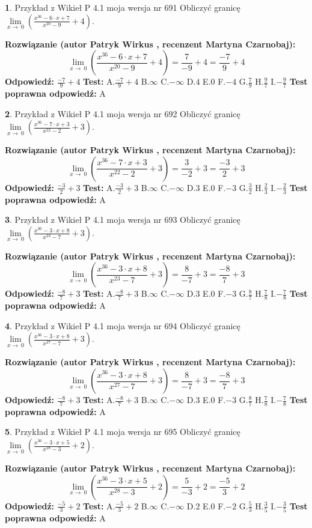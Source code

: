 \documentclass[12pt, a4paper]{article}
\theoremstyle{definition} %
\newtheorem{zad}{}
\newcommand{\zadStart}[1]{\begin{zad}#1\newline}
\newcommand{\zadStop}{\end{zad}}
\newcommand{\rozwStart}[2]{\noindent \textbf{Rozwiązanie (autor #1 , recenzent #2): }\newline}
\newcommand{\rozwStop}{\newline}
\newcommand{\odpStart}{\noindent \textbf{Odpowiedź:}\newline}
\newcommand{\odpStop}{\newline}
\newcommand{\testStart}{\noindent \textbf{Test:}\newline}
\newcommand{\testStop}{\newline}
\newcommand{\kluczStart}{\noindent \textbf{Test poprawna odpowiedź:}\newline}
\newcommand{\kluczStop}{\newline}
\begin{document}
\zadStart{Przykład z Wikieł P 4.1 moja wersja nr 691}
Obliczyć granicę $\lim\limits_{x\to\ 0}(\frac{x^{36}-6 \cdot x +7}{x^{20}-9}+4)$.
\zadStop
\rozwStart{Patryk Wirkus}{Martyna Czarnobaj}
$$\lim\limits_{x\to\ 0}(\frac{x^{36}-6 \cdot x +7}{x^{20}-9}+4)=\frac{7}{-9}+4=\frac{-7}{9}+4$$
\rozwStop
\odpStart
$\frac{-7}{9}+4$
\odpStop
\testStart
A.$\frac{-7}{9}+4$
B.$\infty$
C.$-\infty$
D.$4$
E.$0$
F.$-4$
G.$\frac{7}{9}$
H.$\frac{9}{7}$
I.$-\frac{9}{7}$
\testStop
\kluczStart
A
\kluczStop



\zadStart{Przykład z Wikieł P 4.1 moja wersja nr 692}
Obliczyć granicę $\lim\limits_{x\to\ 0}(\frac{x^{36}-7 \cdot x +3}{x^{22}-2}+3)$.
\zadStop
\rozwStart{Patryk Wirkus}{Martyna Czarnobaj}
$$\lim\limits_{x\to\ 0}(\frac{x^{36}-7 \cdot x +3}{x^{22}-2}+3)=\frac{3}{-2}+3=\frac{-3}{2}+3$$
\rozwStop
\odpStart
$\frac{-3}{2}+3$
\odpStop
\testStart
A.$\frac{-3}{2}+3$
B.$\infty$
C.$-\infty$
D.$3$
E.$0$
F.$-3$
G.$\frac{3}{2}$
H.$\frac{2}{3}$
I.$-\frac{2}{3}$
\testStop
\kluczStart
A
\kluczStop



\zadStart{Przykład z Wikieł P 4.1 moja wersja nr 693}
Obliczyć granicę $\lim\limits_{x\to\ 0}(\frac{x^{36}-3 \cdot x +8}{x^{23}-7}+3)$.
\zadStop
\rozwStart{Patryk Wirkus}{Martyna Czarnobaj}
$$\lim\limits_{x\to\ 0}(\frac{x^{36}-3 \cdot x +8}{x^{23}-7}+3)=\frac{8}{-7}+3=\frac{-8}{7}+3$$
\rozwStop
\odpStart
$\frac{-8}{7}+3$
\odpStop
\testStart
A.$\frac{-8}{7}+3$
B.$\infty$
C.$-\infty$
D.$3$
E.$0$
F.$-3$
G.$\frac{8}{7}$
H.$\frac{7}{8}$
I.$-\frac{7}{8}$
\testStop
\kluczStart
A
\kluczStop



\zadStart{Przykład z Wikieł P 4.1 moja wersja nr 694}
Obliczyć granicę $\lim\limits_{x\to\ 0}(\frac{x^{36}-3 \cdot x +8}{x^{27}-7}+3)$.
\zadStop
\rozwStart{Patryk Wirkus}{Martyna Czarnobaj}
$$\lim\limits_{x\to\ 0}(\frac{x^{36}-3 \cdot x +8}{x^{27}-7}+3)=\frac{8}{-7}+3=\frac{-8}{7}+3$$
\rozwStop
\odpStart
$\frac{-8}{7}+3$
\odpStop
\testStart
A.$\frac{-8}{7}+3$
B.$\infty$
C.$-\infty$
D.$3$
E.$0$
F.$-3$
G.$\frac{8}{7}$
H.$\frac{7}{8}$
I.$-\frac{7}{8}$
\testStop
\kluczStart
A
\kluczStop



\zadStart{Przykład z Wikieł P 4.1 moja wersja nr 695}
Obliczyć granicę $\lim\limits_{x\to\ 0}(\frac{x^{36}-3 \cdot x +5}{x^{28}-3}+2)$.
\zadStop
\rozwStart{Patryk Wirkus}{Martyna Czarnobaj}
$$\lim\limits_{x\to\ 0}(\frac{x^{36}-3 \cdot x +5}{x^{28}-3}+2)=\frac{5}{-3}+2=\frac{-5}{3}+2$$
\rozwStop
\odpStart
$\frac{-5}{3}+2$
\odpStop
\testStart
A.$\frac{-5}{3}+2$
B.$\infty$
C.$-\infty$
D.$2$
E.$0$
F.$-2$
G.$\frac{5}{3}$
H.$\frac{3}{5}$
I.$-\frac{3}{5}$
\testStop
\kluczStart
A
\kluczStop
\end{document}
